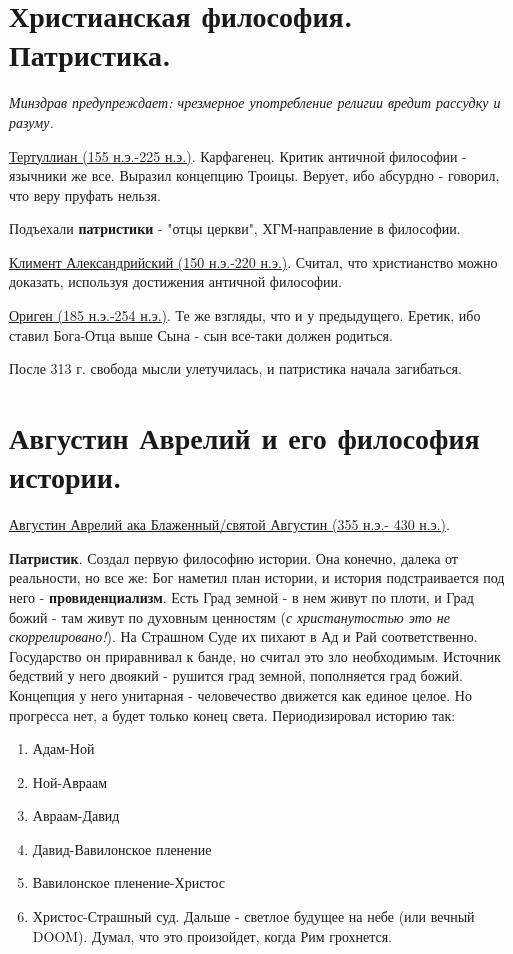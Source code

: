 \documentclass[12pt,a4paper]{article}
\begin{document}
\section{Христианская философия. Патристика.}
\textit{Минздрав предупреждает: чрезмерное употребление религии вредит рассудку и разуму.}

\underline{Тертуллиан (155 н.э.-225 н.э.)}. Карфагенец. Критик античной философии - язычники же все. Выразил концепцию Троицы. Верует, ибо абсурдно - говорил, что веру пруфать нельзя. 

Подъехали \textbf{патристики} - "отцы церкви", ХГМ-направление в философии.

\underline{Климент Александрийский (150 н.э.-220 н.э.)}. Считал, что христианство можно доказать, используя достижения античной философии.

\underline{Ориген (185 н.э.-254 н.э.)}. Те же взгляды, что и у предыдущего. Еретик, ибо ставил Бога-Отца выше Сына - сын все-таки должен родиться.
 
После 313 г. свобода мысли улетучилась, и патристика начала загибаться.

\section{Августин Аврелий и его философия истории.}
\hspace{8pt} 
\underline{Августин Аврелий ака Блаженный/святой Августин (355 н.э.- 430 н.э.)}. 

\textbf{Патристик}. Создал первую философию истории. Она конечно, далека от реальности, но все же: Бог наметил план истории, и история подстраивается под него - \textbf{провиденциализм}. Есть Град земной - в нем живут по плоти, и Град божий - там живут по духовным ценностям (\textit{с христанутостью это не скоррелировано!}). На Страшном Суде их пихают в Ад и Рай соответственно. Государство он приравнивал к банде, но считал это зло необходимым. Источник бедствий у него двоякий - рушится град земной, пополняется град божий. Концепция у него унитарная - человечество движется как единое целое. Но прогресса нет, а будет только конец света. Периодизировал историю так:
\begin{enumerate}
\item Адам-Ной
\item Ной-Авраам
\item Авраам-Давид
\item Давид-Вавилонское пленение
\item Вавилонское пленение-Христос
\item Христос-Страшный суд. Дальше - светлое будущее на небе (или вечный DOOM). Думал, что это произойдет, когда Рим грохнется.
\end{enumerate}
\newpage
\end{document}
